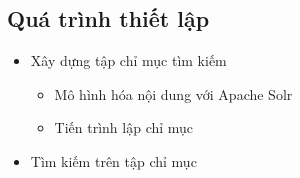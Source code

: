 \subsection{Quá trình thiết lập}

\begin{itemize}
    \item Xây dựng tập chỉ mục tìm kiếm
    \begin{itemize}
        \item Mô hình hóa nội dung với Apache Solr
        \item Tiến trình lập chỉ mục
    \end{itemize}
    
    \item Tìm kiếm trên tập chỉ mục
\end{itemize}
